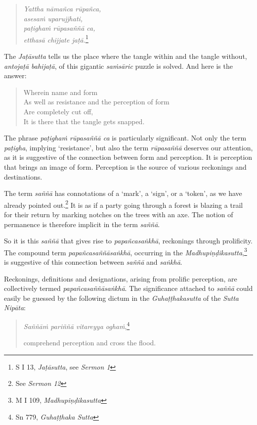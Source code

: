 \begin{quote}
\emph{Yattha nāmañca rūpañca,}\\
\emph{asesaṁ uparujjhati,}\\
\emph{paṭighaṁ rūpasaññā ca,}\\
\emph{etthasā chijjate jaṭā.}\footnote{S I 13, \emph{Jaṭāsutta}, see \emph{Sermon 1}}
\end{quote}

\clearpage

The \emph{Jaṭāsutta} tells us the place where the tangle within and the tangle without, \emph{antojaṭā bahijaṭā}, of this gigantic \emph{saṁsāric} puzzle is solved. And here is the answer:

\begin{quote}
Wherein name and form\\
As well as resistance and the perception of form\\
Are completely cut off,\\
It is there that the tangle gets snapped.
\end{quote}

The phrase \emph{paṭighaṁ rūpasaññā ca} is particularly significant. Not only the term \emph{paṭigha}, implying `resistance', but also the term \emph{rūpasaññā} deserves our attention, as it is suggestive of the connection between form and perception. It is perception that brings an image of form. Perception is the source of various reckonings and destinations.

The term \emph{saññā} has connotations of a `mark', a `sign', or a `token', as we have already pointed out.\footnote{See \emph{Sermon 12}} It is as if a party going through a forest is blazing a trail for their return by marking notches on the trees with an axe. The notion of permanence is therefore implicit in the term \emph{saññā}.

So it is this \emph{saññā} that gives rise to \emph{papañcasaṅkhā}, reckonings through prolificity. The compound term \emph{papañcasaññāsaṅkhā}, occurring in the \emph{Madhupiṇḍikasutta},\footnote{M I 109, \emph{Madhupiṇḍikasutta}} is suggestive of this connection between \emph{saññā} and \emph{saṅkhā}.

Reckonings, definitions and designations, arising from prolific perception, are collectively termed \emph{papañcasaññāsaṅkhā}. The significance attached to \emph{saññā} could easily be guessed by the following dictum in the \emph{Guhaṭṭhakasutta} of the \emph{Sutta Nipāta}:

\begin{quote}
\emph{Saññāṁ pariññā vitareyya oghaṁ},\footnote{Sn 779, \emph{Guhaṭṭhaka Sutta}}

comprehend perception and cross the flood.
\end{quote}

